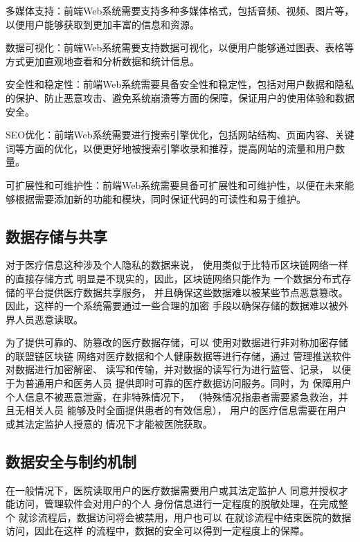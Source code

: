 \documentclass[UTF8]{ctexart}
\begin{document}
    多媒体支持：前端Web系统需要支持多种多媒体格式，包括音频、视频、图片等，以便用户能够获取到更加丰富的信息和资源。

    数据可视化：前端Web系统需要支持数据可视化，以便用户能够通过图表、表格等方式更加直观地查看和分析数据和统计信息。

    安全性和稳定性：前端Web系统需要具备安全性和稳定性，包括对用户数据和隐私的保护、防止恶意攻击、避免系统崩溃等方面的保障，保证用户的使用体验和数据安全。

    SEO优化：前端Web系统需要进行搜索引擎优化，包括网站结构、页面内容、关键词等方面的优化，以便更好地被搜索引擎收录和推荐，提高网站的流量和用户数量。

    可扩展性和可维护性：前端Web系统需要具备可扩展性和可维护性，以便在未来能够根据需要添加新的功能和模块，同时保证代码的可读性和易于维护。

    \subsection{数据存储与共享}
    \par
    对于医疗信息这种涉及个人隐私的数据来说，
    使用类似于比特币区块链网络一样的直接存储方式
    明显是不现实的，因此，区块链网络只能作为
    一个数据分布式存储的平台提供医疗数据共享服务，
    并且确保这些数据难以被某些节点恶意篡改。
    因此，这样的一个系统需要通过一些合理的加密
    手段以确保存储的数据难以被外界人员恶意读取。
    \par
    为了提供可靠的、防篡改的医疗数据存储，可以
    使用对数据进行非对称加密存储的联盟链区块链
    网络对医疗数据和个人健康数据等进行存储，通过
    管理推送软件对数据进行加密解密、
    读写和传输，并对数据的读写行为进行监管、记录，
    以便于为普通用户和医务人员
    提供即时可靠的医疗数据访问服务。同时，为
    保障用户个人信息不被恶意泄露，在非特殊情况下，
    （特殊情况指患者需要紧急救治，并且无相关人员
    能够及时全面提供患者的有效信息），
    用户的医疗信息需要在用户或其法定监护人授意的
    情况下才能被医院获取。
    \subsection{数据安全与制约机制}
    \par
    在一般情况下，医院读取用户的医疗数据需要用户或其法定监护人
    同意并授权才能访问，管理软件会对用户的个人
    身份信息进行一定程度的脱敏处理，在完成整个
    就诊流程后，数据访问将会被禁用，用户也可以
    在就诊流程中结束医院的数据访问，因此在这样
    的流程中，数据的安全可以得到一定程度上的保障。
    
\end{document}
